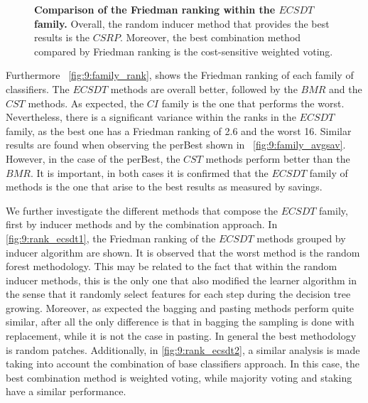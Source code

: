 { \begin{figure}[!t]
  \centering
  \hfil
  \caption{\textbf{Comparison of the Friedman ranking within the $ECSDT$ family.} Overall, the 
  random inducer method that provides the best results is the $CSRP$. Moreover, the best 
  combination method compared by Friedman ranking is the cost-sensitive weighted voting.}
  \label{fig:9:rank_ecsdt}
\end{figure}
 
  Furthermore \figurename{~\ref{fig:9:family_rank}}, shows the Friedman ranking of each family of 
  classifiers. The $ECSDT$ methods are overall better, followed by the $BMR$ and the $CST$ methods. 
  As expected, the $CI$ family is the one that performs the worst. Nevertheless, there is 
  a significant variance within the ranks in the $ECSDT$ family, as the best one has a Friedman 
  ranking of 2.6 and the worst 16. Similar results are found when observing the perBest shown in 
  \figurename{~\ref{fig:9:family_avgsav}}. However, in the case of the perBest, the $CST$ methods 
  perform better than the $BMR$. It is important, in both cases it is confirmed that the $ECSDT$ 
  family of methods is the one that arise to the best results as measured by savings.

  We further investigate the different methods that compose the $ECSDT$ family, first by inducer 
  methods and by the combination approach. In \figurename{ \ref{fig:9:rank_ecsdt1}}, the Friedman 
  ranking of the $ECSDT$ methods grouped by inducer algorithm are shown. It is observed that the 
  worst method is the random forest methodology. This may be related to the fact that within the 
  random inducer methods, this is the only one that also modified the learner algorithm in the 
  sense that it randomly select features for each step during the decision tree growing. Moreover, 
  as expected the bagging and pasting methods perform quite similar, after all the only difference 
  is that in bagging the sampling is done with replacement, while it is not the case in pasting. 
  In  general the best methodology is random patches. Additionally, in \figurename{ 
  \ref{fig:9:rank_ecsdt2}}, a similar analysis is made taking into account the combination of base 
  classifiers approach. In this case, the best combination method is weighted voting, while 
  majority voting and staking have a similar performance.

}
